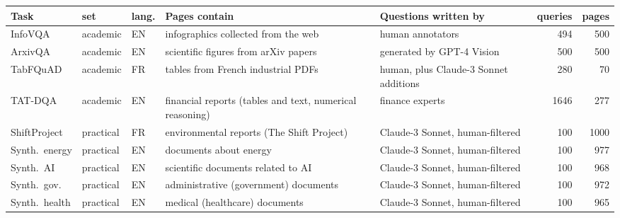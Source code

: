 \begin{adjustbox}{max width=\linewidth}
\begin{tabular}{llll p{3.6cm} rr}
\toprule
Task & set & lang. & Pages contain & Questions written by & queries & pages \\
\midrule
InfoVQA & academic & EN & infographics collected from the web & human annotators & 494 & 500 \\
ArxivQA & academic & EN & scientific figures from arXiv papers & generated by GPT-4 Vision & 500 & 500 \\
TabFQuAD & academic & FR & tables from French industrial PDFs & human, plus Claude-3 Sonnet additions & 280 & 70 \\
TAT-DQA & academic & EN & financial reports (tables and text, numerical reasoning) & finance experts & 1646 & 277 \\
ShiftProject & practical & FR & environmental reports (The Shift Project) & Claude-3 Sonnet, human-filtered & 100 & 1000 \\
Synth.\ energy & practical & EN & documents about energy & Claude-3 Sonnet, human-filtered & 100 & 977 \\
Synth.\ AI & practical & EN & scientific documents related to AI & Claude-3 Sonnet, human-filtered & 100 & 968 \\
Synth.\ gov. & practical & EN & administrative (government) documents & Claude-3 Sonnet, human-filtered & 100 & 972 \\
Synth.\ health & practical & EN & medical (healthcare) documents & Claude-3 Sonnet, human-filtered & 100 & 965 \\
\bottomrule
\end{tabular}
\end{adjustbox}
\par{}
